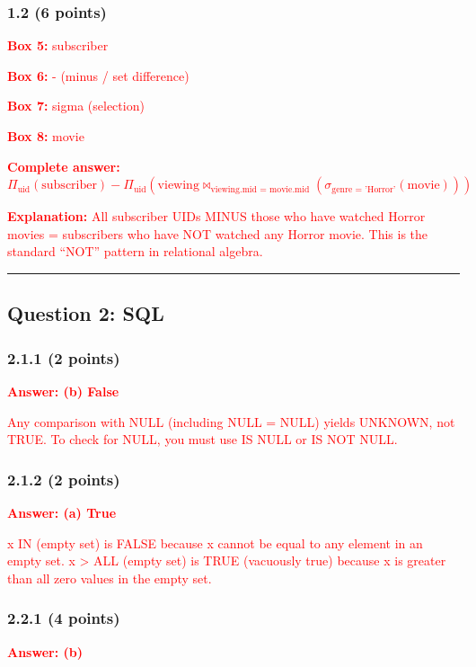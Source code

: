 \documentclass[11pt,a4paper]{article}
\begin{document}
\subsubsection*{1.2 (6 points)}
\textcolor{red}{\textbf{Box 5:} subscriber}

\textcolor{red}{\textbf{Box 6:} - (minus / set difference)}

\textcolor{red}{\textbf{Box 7:} sigma (selection)}

\textcolor{red}{\textbf{Box 8:} movie}

\textcolor{red}{\textbf{Complete answer:} $\Pi_{\text{uid}}(\text{subscriber}) - \Pi_{\text{uid}}(\text{viewing} \bowtie_{\text{viewing.mid = movie.mid}} (\sigma_{\text{genre = 'Horror'}}(\text{movie})))$}

\textcolor{red}{\textbf{Explanation:} All subscriber UIDs MINUS those who have watched Horror movies = subscribers who have NOT watched any Horror movie. This is the standard ``NOT'' pattern in relational algebra.}

\hrule
\vspace{1em}

\subsection*{Question 2: SQL}

\subsubsection*{2.1.1 (2 points)}
\textcolor{red}{\textbf{Answer: (b) False}}

\textcolor{red}{Any comparison with NULL (including NULL = NULL) yields UNKNOWN, not TRUE. To check for NULL, you must use IS NULL or IS NOT NULL.}

\subsubsection*{2.1.2 (2 points)}
\textcolor{red}{\textbf{Answer: (a) True}}

\textcolor{red}{x IN (empty set) is FALSE because x cannot be equal to any element in an empty set. x > ALL (empty set) is TRUE (vacuously true) because x is greater than all zero values in the empty set.}

\subsubsection*{2.2.1 (4 points)}
\textcolor{red}{\textbf{Answer: (b)}}
\end{document}
